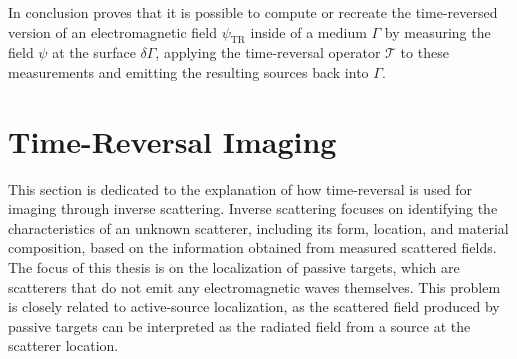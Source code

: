 In conclusion \parencite{de_rosny_theory_2010} proves that it is possible to compute or recreate the time-reversed version of an electromagnetic field \(\psi_{\text{TR}}\) inside of a medium \(\Gamma \) by measuring the field \(\psi \) at the surface \(\delta \Gamma \), applying the time-reversal operator \(\mathcal{T}\) to these measurements and emitting the resulting sources back into \(\Gamma \).



\section{Time-Reversal Imaging}
This section is dedicated to the explanation of how time-reversal is used for imaging through inverse scattering.
Inverse scattering focuses on identifying the characteristics of an unknown scatterer, including its form, location, and material composition, based on the information obtained from measured scattered fields.
The focus of this thesis is on the localization of passive targets, which are scatterers that do not emit any electromagnetic waves themselves.
This problem is closely related to active-source localization, as the scattered field produced by passive targets can be interpreted as the radiated field from a source at the scatterer location.~\parencite{chen_computational_2018}

